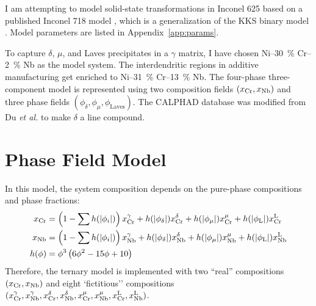 \documentclass[10pt]{article}
\begin{document}
	I am attempting to model solid-state transformations in Inconel 625 based on a published Inconel 718 model \cite{Zhou2014},
	which is a generalization of the KKS binary model \cite{Kim1999}.
	Model parameters are listed in Appendix~\ref{app:params}.
	
	To capture $\delta$, $\mu$, and Laves precipitates in a $\gamma$ matrix, I have chosen Ni--\SI{30}{\percent} Cr--\SI{2}{\percent} Nb as the model system.
	The interdendritic regions in additive manufacturing get enriched to Ni--\SI{31}{\percent} Cr--\SI{13}{\percent} Nb.
	The four-phase three-component model is represented using two composition fields $\left(x_{\ce{Cr}}, x_{\ce{Nb}}\right)$
	and three phase fields $\left(\phi_\delta, \phi_\mu, \phi_{\mathrm{Laves}}\right)$.
	The CALPHAD database was modified from Du \emph{et al.} \cite{Du2005} to make $\delta$ a line compound.




	\section{Phase Field Model}
		In this model, the system composition depends on the pure-phase compositions and phase fractions:
		\begin{align}
			x_{\ce{Cr}} &= \left( 1-\sum h(|\phi_i|) \right) x_{\ce{Cr}}^{\gamma}
			             + h(|\phi_\delta|) x_{\ce{Cr}}^{\delta}
			             + h(|\phi_\mu|) x_{\ce{Cr}}^{\mu}
			             + h(|\phi_{\mathrm{L}}|) x_{\ce{Cr}}^{\mathrm{L}}
						\label{eqn:conscr}\\
			x_{\ce{Nb}} &= \left( 1-\sum h(|\phi_i|) \right) x_{\ce{Nb}}^{\gamma}
			             + h(|\phi_\delta|) x_{\ce{Nb}}^{\delta}
			             + h(|\phi_\mu|) x_{\ce{Nb}}^{\mu}
			             + h(|\phi_{\mathrm{L}}|) x_{\ce{Nb}}^{\mathrm{L}}
 			             \label{eqn:consnb}\\
 			h(\phi)     &= \phi^3\left(6\phi^2 - 15\phi + 10\right)\label{eqn:interp}
		\end{align}
		Therefore, the ternary model is implemented with two ``real'' compositions $(x_{\ce{Cr}}, x_{\ce{Nb}})$ and
		eight `fictitious'' compositions $(x_{\ce{Cr}}^{\gamma}, x_{\ce{Nb}}^{\gamma}, x_{\ce{Cr}}^{\delta}, x_{\ce{Nb}}^{\delta}, x_{\ce{Cr}}^{\mu}, x_{\ce{Nb}}^{\mu}, x_{\ce{Cr}}^{\mathrm{L}}, x_{\ce{Nb}}^{\mathrm{L}})$.
\end{document}
